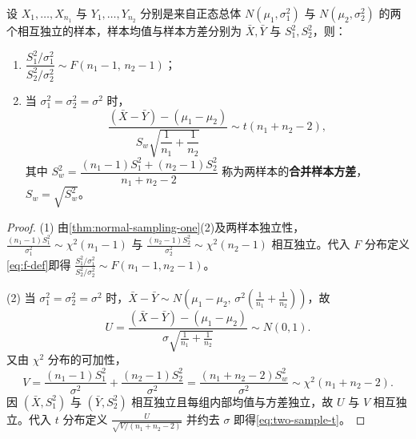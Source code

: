 \begin{theorem}[两个独立正态总体的抽样分布]
\label{thm:normal-sampling-two}
设 $X_1,\ldots,X_{n_1}$ 与 $Y_1,\ldots,Y_{n_2}$ 分别是来自正态总体 $N(\mu_1,\sigma_1^2)$ 与 $N(\mu_2,\sigma_2^2)$ 的两个相互独立的样本，样本均值与样本方差分别为 $\bar{X},\bar{Y}$ 与 $S_1^2,S_2^2$，则：
\begin{enumerate}
  \item $\dfrac{S_1^2/\sigma_1^2}{S_2^2/\sigma_2^2}\sim F(n_1-1,\,n_2-1)$；
  \item 当 $\sigma_1^2=\sigma_2^2=\sigma^2$ 时，
  \begin{equation}
    \frac{(\bar{X}-\bar{Y})-(\mu_1-\mu_2)}{S_w\sqrt{\dfrac{1}{n_1}+\dfrac{1}{n_2}}}\sim t(n_1+n_2-2),
    \label{eq:two-sample-t}
  \end{equation}
  其中 $S_w^2=\dfrac{(n_1-1)S_1^2+(n_2-1)S_2^2}{n_1+n_2-2}$ 称为两样本的\textbf{合并样本方差}，$S_w=\sqrt{S_w^2}$。
\end{enumerate}
\end{theorem}
\begin{proof}
(1) 由\cref{thm:normal-sampling-one}(2)及两样本独立性，$\frac{(n_1-1)S_1^2}{\sigma_1^2}\sim\chi^2(n_1-1)$ 与 $\frac{(n_2-1)S_2^2}{\sigma_2^2}\sim\chi^2(n_2-1)$ 相互独立。代入 $F$ 分布定义\eqref{eq:f-def}即得 $\frac{S_1^2/\sigma_1^2}{S_2^2/\sigma_2^2}\sim F(n_1-1,n_2-1)$。

(2) 当 $\sigma_1^2=\sigma_2^2=\sigma^2$ 时，$\bar{X}-\bar{Y}\sim N\!\left(\mu_1-\mu_2,\,\sigma^2\left(\frac{1}{n_1}+\frac{1}{n_2}\right)\right)$，故
\[
  U=\frac{(\bar{X}-\bar{Y})-(\mu_1-\mu_2)}{\sigma\sqrt{\frac{1}{n_1}+\frac{1}{n_2}}}\sim N(0,1).
\]
又由 $\chi^2$ 分布的可加性，
\[
  V=\frac{(n_1-1)S_1^2}{\sigma^2}+\frac{(n_2-1)S_2^2}{\sigma^2}
  =\frac{(n_1+n_2-2)S_w^2}{\sigma^2}\sim\chi^2(n_1+n_2-2).
\]
因 $(\bar{X},S_1^2)$ 与 $(\bar{Y},S_2^2)$ 相互独立且每组内部均值与方差独立，故 $U$ 与 $V$ 相互独立。代入 $t$ 分布定义 $\frac{U}{\sqrt{V/(n_1+n_2-2)}}$ 并约去 $\sigma$ 即得\eqref{eq:two-sample-t}。
\end{proof}

